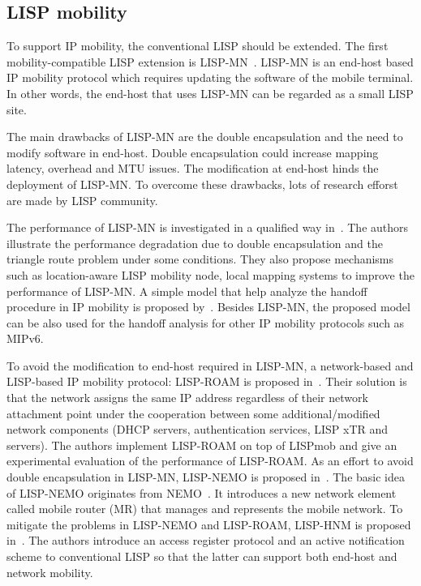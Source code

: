 \subsection{LISP mobility}
\label{subsec:lisp_mobility}
To support IP mobility, the conventional LISP should be extended. The first mobility-compatible LISP extension is LISP-MN~\cite{mn00}\cite{natal2013lisp}. LISP-MN is an end-host based IP mobility protocol which requires updating the software of the mobile terminal. In other words, the end-host that uses LISP-MN can be regarded as a small LISP site.

The main drawbacks of LISP-MN are the double encapsulation and the need to modify software in end-host. Double encapsulation could increase mapping latency, overhead and MTU issues. The modification at end-host hinds the deployment of LISP-MN. To overcome these drawbacks, lots of research efforst are made by LISP community.

The performance of LISP-MN is investigated in a qualified way in~\cite{menth2010improvements}. The authors illustrate the performance degradation due to double encapsulation and the triangle route problem under some conditions. They also propose mechanisms such as location-aware LISP mobility node, local mapping systems to improve the performance of LISP-MN. A simple model that help analyze the handoff procedure in IP mobility is proposed by~\cite{phoomikiattisak2016control}. Besides LISP-MN, the proposed model can be also used for the handoff analysis for other IP mobility protocols such as MIPv6. 

To avoid the modification to end-host required in LISP-MN, a network-based and LISP-based IP mobility protocol: LISP-ROAM is proposed in~\cite{galvani2014lisp}. Their solution is that the network assigns the same IP address regardless of their network attachment point under the cooperation between some additional/modified network components (DHCP servers, authentication services, LISP xTR and servers). The authors implement LISP-ROAM on top of LISPmob and give an experimental evaluation of the performance of LISP-ROAM. As an effort to avoid double encapsulation in LISP-MN, LISP-NEMO is proposed in~\cite{wu2014nemo}. The basic idea of LISP-NEMO originates from NEMO~\cite{jeon2010network}. It introduces a new network element called mobile router (MR) that manages and represents the mobile network. To mitigate the problems in LISP-NEMO and LISP-ROAM, LISP-HNM is proposed in~\cite{tang2017lisp}. The authors introduce an access register protocol and an active
notification scheme to conventional LISP so that the latter can support both end-host and network mobility.

